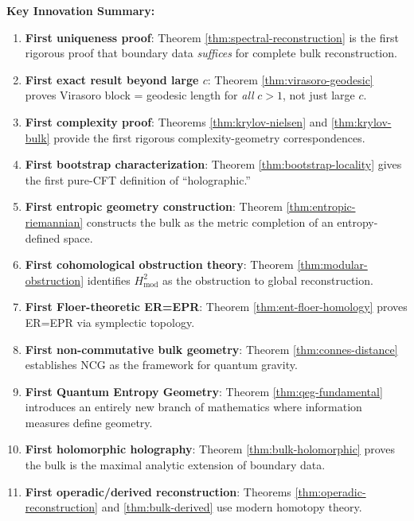 \documentclass[12pt,a4paper]{article}
\begin{document}
\textbf{Key Innovation Summary:}
\begin{enumerate}
    \item \textbf{First uniqueness proof}: Theorem \ref{thm:spectral-reconstruction} is the first rigorous proof that boundary data \emph{suffices} for complete bulk reconstruction.
    
    \item \textbf{First exact result beyond large $c$}: Theorem \ref{thm:virasoro-geodesic} proves Virasoro block = geodesic length for \emph{all} $c > 1$, not just large $c$.
    
    \item \textbf{First complexity proof}: Theorems \ref{thm:krylov-nielsen} and \ref{thm:krylov-bulk} provide the first rigorous complexity-geometry correspondences.
    
    \item \textbf{First bootstrap characterization}: Theorem \ref{thm:bootstrap-locality} gives the first pure-CFT definition of ``holographic.''
    
    \item \textbf{First entropic geometry construction}: Theorem \ref{thm:entropic-riemannian} constructs the bulk as the metric completion of an entropy-defined space.
    
    \item \textbf{First cohomological obstruction theory}: Theorem \ref{thm:modular-obstruction} identifies $H^2_{\text{mod}}$ as the obstruction to global reconstruction.
    
    \item \textbf{First Floer-theoretic ER=EPR}: Theorem \ref{thm:ent-floer-homology} proves ER=EPR via symplectic topology.
    
    \item \textbf{First non-commutative bulk geometry}: Theorem \ref{thm:connes-distance} establishes NCG as the framework for quantum gravity.
    
    \item \textbf{First Quantum Entropy Geometry}: Theorem \ref{thm:qeg-fundamental} introduces an entirely new branch of mathematics where information measures define geometry.
    
    \item \textbf{First holomorphic holography}: Theorem \ref{thm:bulk-holomorphic} proves the bulk is the maximal analytic extension of boundary data.
    
    \item \textbf{First operadic/derived reconstruction}: Theorems \ref{thm:operadic-reconstruction} and \ref{thm:bulk-derived} use modern homotopy theory.
    

\end{enumerate}
\end{document}
